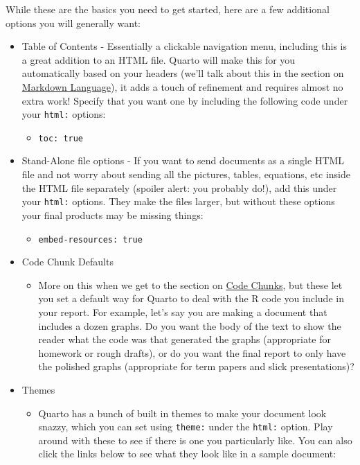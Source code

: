 \documentclass[
  letterpaper,
]{book}
\providecommand{\tightlist}{%
  \setlength{\itemsep}{0pt}\setlength{\parskip}{0pt}}\usepackage{longtable,booktabs,array}
\begin{document}
While these are the basics you need to get started, here are a few
additional options you will generally want:

\begin{itemize}
\item
  Table of Contents - Essentially a clickable navigation menu, including
  this is a great addition to an HTML file. Quarto will make this for
  you automatically based on your headers (we'll talk about this in the
  section on \hyperref[markdown-language]{Markdown Language}), it adds a
  touch of refinement and requires almost no extra work! Specify that
  you want one by including the following code under your \texttt{html:}
  options:

  \begin{itemize}
  \tightlist
  \item
    \texttt{toc:\ true}
  \end{itemize}
\item
  Stand-Alone file options - If you want to send documents as a single
  HTML file and not worry about sending all the pictures, tables,
  equations, etc inside the HTML file separately (spoiler alert: you
  probably do!), add this under your \texttt{html:} options. They make
  the files larger, but without these options your final products may be
  missing things:

  \begin{itemize}
  \tightlist
  \item
    \texttt{embed-resources:\ true}
  \end{itemize}
\item
  Code Chunk Defaults

  \begin{itemize}
  \tightlist
  \item
    More on this when we get to the section on
    \hyperref[code-chunks]{Code Chunks}, but these let you set a default
    way for Quarto to deal with the R code you include in your report.
    For example, let's say you are making a document that includes a
    dozen graphs. Do you want the body of the text to show the reader
    what the code was that generated the graphs (appropriate for
    homework or rough drafts), or do you want the final report to only
    have the polished graphs (appropriate for term papers and slick
    presentations)?
  \end{itemize}
\item
  Themes

  \begin{itemize}
  \tightlist
  \item
    Quarto has a bunch of built in themes to make your document look
    snazzy, which you can set using \texttt{theme:} under the
    \texttt{html:} option. Play around with these to see if there is one
    you particularly like. You can also click the links below to see
    what they look like in a sample document:


\end{itemize}
\end{itemize}
\end{document}
